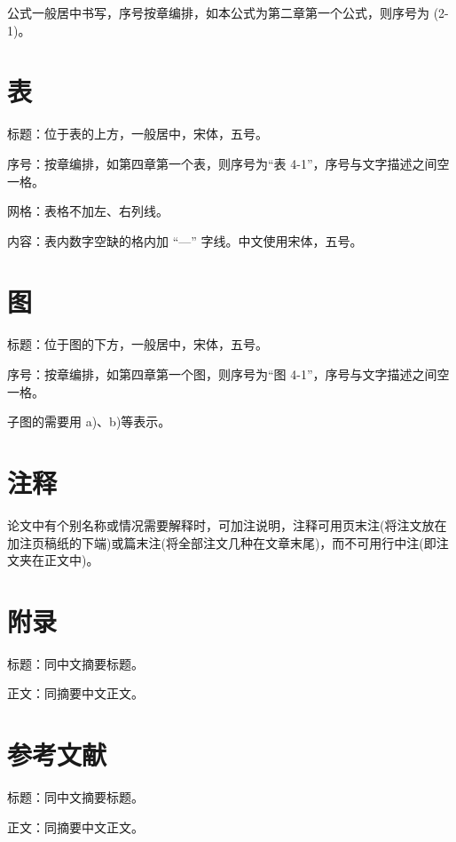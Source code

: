 公式一般居中书写，序号按章编排，如本公式为第二章第一个公式，则序号为 (2-1)。

\section{表}

标题：位于表的上方，一般居中，宋体，五号。

序号：按章编排，如第四章第一个表，则序号为“表 4-1”，序号与文字描述之间空一格。

网格：表格不加左、右列线。

内容：表内数字空缺的格内加 “—” 字线。中文使用宋体，五号。

\section{图}

标题：位于图的下方，一般居中，宋体，五号。

序号：按章编排，如第四章第一个图，则序号为“图 4-1”，序号与文字描述之间空一格。

子图的需要用 a)、b)等表示。

\section{注释}

论文中有个别名称或情况需要解释时，可加注说明，注释可用页末注(将注文放在加注页稿纸的下端)或篇末注(将全部注文几种在文章末尾)，而不可用行中注(即注文夹在正文中)。


\section{附录}

标题：同中文摘要标题。

正文：同摘要中文正文。

\section{参考文献}

标题：同中文摘要标题。

正文：同摘要中文正文。

